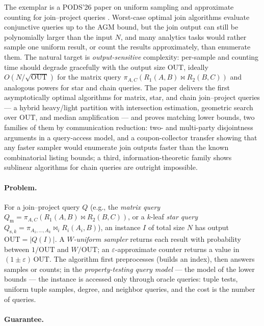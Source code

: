 The exemplar is a PODS'26 paper on uniform sampling and approximate counting for
join--project queries \citep{sigmod26-243}\pods. Worst-case optimal join algorithms
evaluate conjunctive queries up to the AGM bound, but the join output can still be
polynomially larger than the input $N$, and many analytics tasks would rather sample
one uniform result, or count the results approximately, than enumerate them. The
natural target is \emph{output-sensitive} complexity: per-sample and counting time
should degrade gracefully with the output size $\mathrm{OUT}$, ideally
$O(N/\sqrt{\mathrm{OUT}})$ for the matrix query $\pi_{A,C}(R_1(A,B) \Join R_2(B,C))$
and analogous powers for star and chain queries. The paper delivers the first
asymptotically optimal algorithms for matrix, star, and chain join--project queries
--- a hybrid heavy/light partition with intersection estimation, geometric search
over $\mathrm{OUT}$, and median amplification --- and proves matching lower bounds,
two families of them by communication reduction: two- and multi-party disjointness
arguments in a query-access model, and a coupon-collector transfer showing that any
faster sampler would enumerate join outputs faster than the known combinatorial
listing bounds; a third, information-theoretic family shows sublinear algorithms for
chain queries are outright impossible.

\paragraph{Problem.}
For a join--project query $Q$ (e.g., the \emph{matrix query}
$Q_{\mathrm{m}} = \pi_{A,C}(R_1(A,B) \Join R_2(B,C))$, or a $k$-leaf \emph{star
query} $Q_{\mathrm{s},k} = \pi_{A_1,\dots,A_k} \Join_i R_i(A_i, B)$), an instance $I$
of total size $N$ has output $\mathrm{OUT} = |Q(I)|$. A \emph{$W$-uniform sampler}
returns each result with probability between $1/\mathrm{OUT}$ and
$W/\mathrm{OUT}$; an $\varepsilon$-approximate counter returns a value in
$(1 \pm \varepsilon)\, \mathrm{OUT}$. The algorithm first preprocesses (builds an
index), then answers samples or counts; in the \emph{property-testing query model}
--- the model of the lower bounds --- the instance is accessed only through oracle
queries: tuple tests, uniform tuple samples, degree, and neighbor queries, and the
cost is the number of queries.

\paragraph{Guarantee.}

